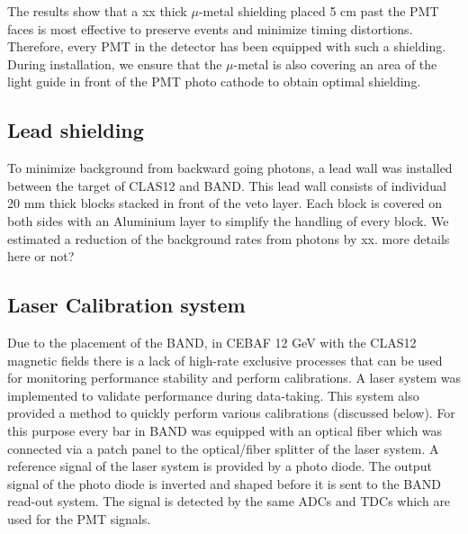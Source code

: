 \documentclass[3p,final,twocolumn]{elsarticle}
\begin{document}
The results show that a xx thick $\mu$-metal shielding placed 5 cm past the PMT faces is most effective to preserve events and minimize timing distortions. Therefore, every PMT in the detector has been equipped with such a shielding. During installation, we ensure that the $\mu$-metal is also covering an area of the light guide in front of the PMT photo cathode to obtain optimal shielding.

\subsection{Lead shielding}
To minimize background from backward going photons, a lead wall was installed between the target of CLAS12 and BAND. This lead wall consists of individual 20 \si{\milli\meter} thick blocks stacked in front of the veto layer. Each block is covered on both sides with an Aluminium layer to simplify the handling of every block. We estimated a reduction of the background rates from photons by xx. {\color{red} more details here or not?}







\subsection{Laser Calibration system}
Due to the placement of the BAND, in CEBAF 12 \si{\giga\electronvolt} with the CLAS12 magnetic fields \cite{Fair:2020yfx} there is a lack of high-rate exclusive processes 
that can be used for monitoring performance stability and perform calibrations. A laser system \cite{band-laser} was implemented to validate performance during data-taking. This system also 
provided a method to quickly perform various calibrations (discussed below). For this purpose every bar in BAND was equipped with an optical fiber which was connected via a patch panel to the optical/fiber splitter of the laser system. A reference signal of the laser system is provided by a photo diode. The output signal of the photo diode is inverted and shaped before it is sent to the BAND read-out system. The signal is detected by the same ADCs and TDCs which are used for the PMT signals.
\end{document}
